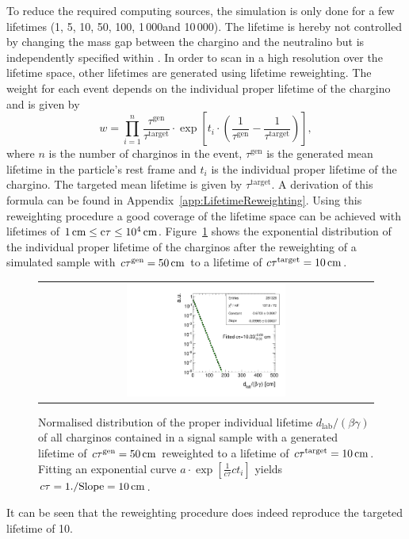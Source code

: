 To reduce the required computing sources, the simulation is only done for a few lifetimes (1\cm, 5\cm, 10\cm, 50\cm, 100\cm, 1\,000\cm and 10\,000\cm).
The lifetime is hereby not controlled by changing the mass gap between the chargino and the neutralino but is independently specified within \geant.
In order to scan in a high resolution over the lifetime space, other lifetimes are generated using lifetime reweighting.
The weight for each event depends on the individual proper lifetime of the chargino and is given by
\begin{equation}
w = \prod_{i=1}^n \frac{\tau^{\text{gen}}}{\tau^{\text{target}}}\cdot  \exp \left[ t_i \cdot \left( \frac{1}{\tau^{\text{gen}}} - \frac{1}{\tau^{\text{target}}} \right) \right] ,
\end{equation}
where $n$ is the  number of charginos in the event, $\tau^{\text{gen}}$ is the generated mean lifetime in the particle's rest frame and $t_i$ is the individual proper lifetime of the chargino. 
The targeted mean lifetime is given by $\tau^{\text{target}}$. 
A derivation of this formula can be found in Appendix~\ref{app:LifetimeReweighting}.
Using this reweighting procedure a good coverage of the lifetime space can be achieved with lifetimes of $1\,\text{cm} \leq \text{c}\tau \leq 10^4 \,\text{cm} $. %
Figure~\ref{fig:LifetimeReweighting} shows the exponential distribution of the individual proper lifetime of the charginos after the reweighting of a simulated sample with $c\tau^{\text{gen}}=50\,\text{cm}$ to a lifetime of $c\tau^{\text{target}}=10\,\text{cm}$.
\begin{figure}[!b]
  \centering 
  \begin{tabular}{c}
    \includegraphics[width=0.49\textwidth]{figures/analysis/10cm.pdf}
  \end{tabular}
  \caption{Normalised distribution of the proper individual lifetime $d_{\text{lab}}/\left(\beta\gamma \right)$ of all charginos contained in a signal sample with a generated lifetime of $c\tau^{\text{gen}}=50\,\text{cm}$ reweighted to a lifetime of $c\tau^{\text{target}}=10\,\text{cm}$. Fitting an exponential curve $a\cdot \exp\left[\frac{1}{c \tau } c t_i\right]$ yields $c\tau=1./\text{Slope}=10\,\text{cm}$.}
  \label{fig:LifetimeReweighting}
\end{figure}
It can be seen that the reweighting procedure does indeed reproduce the targeted lifetime of 10\cm.



